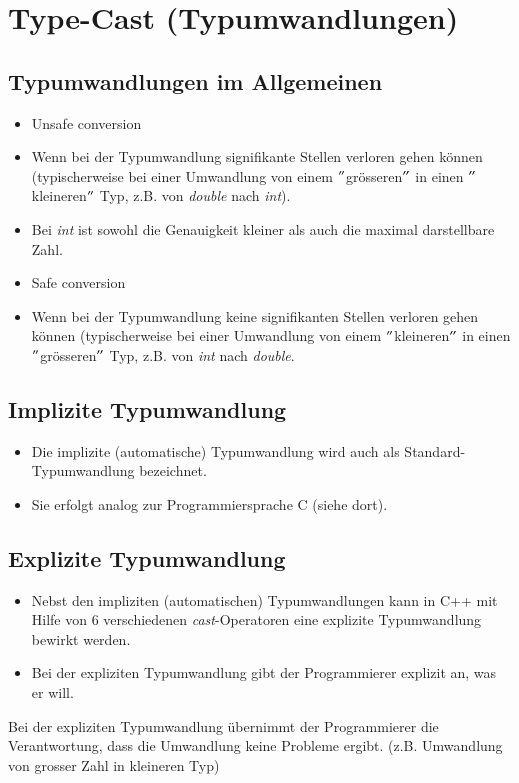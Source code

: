 \section{Type-Cast (Typumwandlungen)}

\subsection{Typumwandlungen im Allgemeinen}
\begin{itemize}
	\item Unsafe conversion
	\item[\-] Wenn bei der Typumwandlung signifikante Stellen verloren gehen können (typischerweise bei einer Umwandlung von einem $"$grösseren$"$ in einen $"$kleineren$"$ Typ, z.B. von \emph{double} nach \emph{int}).
	\item[\-] Bei \emph{int} ist sowohl die Genauigkeit kleiner als auch die maximal darstellbare Zahl.
	\item Safe conversion
	\item[\-] Wenn bei der Typumwandlung keine signifikanten Stellen verloren gehen können (typischerweise bei einer Umwandlung von einem $"$kleineren$"$ in einen $"$grösseren$"$ Typ, z.B. von \emph{int} nach \emph{double}.
\end{itemize}

\subsection{Implizite Typumwandlung}
\begin{itemize}
	\item Die implizite (automatische) Typumwandlung wird auch als Standard-Typumwandlung bezeichnet.
	\item Sie erfolgt analog zur Programmiersprache C (siehe dort).
\end{itemize}

\subsection{Explizite Typumwandlung}
\begin{itemize}
	\item Nebst den impliziten (automatischen) Typumwandlungen kann in C++ mit Hilfe von 6 verschiedenen \emph{cast}-Operatoren eine explizite Typumwandlung bewirkt werden.
	\item Bei der expliziten Typumwandlung gibt der Programmierer explizit an, was er will.
\end{itemize}
\begin{achtung}
	Bei der expliziten Typumwandlung übernimmt der Programmierer die Verantwortung, dass die Umwandlung keine Probleme ergibt. (z.B. Umwandlung von grosser Zahl in kleineren Typ)
\end{achtung}

